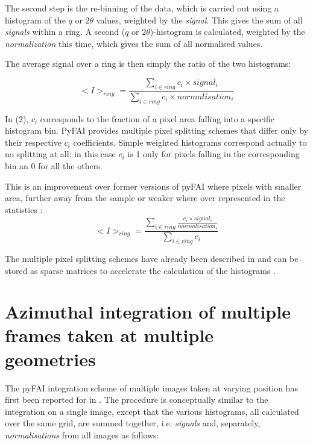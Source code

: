 \documentclass[preprint]{iucr}              %
\begin{document}
The second step is the re-binning of the data, which is carried out 
using a histogram of the $q$ or $2\theta$ values, weighted by the
\textit{signal}.
This gives the sum of all \textit{signals} within a ring.
A second ($q$ or $2\theta$)-histogram is calculated, weighted
by the \textit{normalization} this time, which gives the sum of all
normalised values.

The average signal over a ring is then simply the ratio of the two histograms:

\begin{equation}
<I>_{ring} = \frac{\sum\limits_{i \in ring} c_i \times signal_i}
                  {\sum\limits_{i \in ring} c_i \times normalisation_i} 
\end{equation}

In (2), $c_i$ corresponds to the fraction of a pixel area 
falling into a specific histogram bin. 
PyFAI provides multiple pixel splitting schemes that differ only by their
respective $c_i$ coefficients. 
Simple weighted histograms correspond actually to no splitting at all; in this
case $c_i$ is 1 only for pixels falling in the corresponding bin an 0 for all
the others.

This is an improvement over former versions of pyFAI where pixels with
smaller area, further away from the sample or weaker where over represented in
the statistics :
\begin{equation}
<I>_{ring} = \frac{\sum\limits_{i \in ring} \frac{ c_i \times
signal_i}{normalisation_i}} {\sum\limits_{i \in ring} c_i} 
\end{equation}

The multiple pixel splitting schemes have already been described in
  and can be stored as sparse matrices to accelerate the
 calculation of the histograms  \cite{kieffer_ashiotis-proc-euroscipy-2014}.

\section{Azimuthal integration of multiple frames taken at multiple geometries}

The pyFAI integration scheme of multiple images taken at varying position has
first been reported for  in  \cite{PyFAI_PDJ}. 
The procedure is conceptually similar to the integration on a single image,
except that the various histograms, all calculated over the same
grid, are summed together, i.e. \textit{signals} and, separately, 
\textit{normalisations} from all images as follows: 
\end{document}

